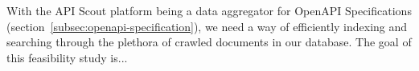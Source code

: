 With the API Scout platform being a data aggregator for OpenAPI Specifications (section~\ref{subsec:openapi-specification}), we need a way of efficiently indexing and searching through the plethora of crawled documents in our database.
The goal of this feasibility study is...